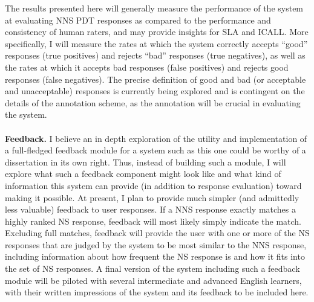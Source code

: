 \documentclass[11pt]{article}
\begin{document}
\par
The results presented here will generally measure the performance of the system at evaluating NNS PDT responses as compared to the performance and consistency of human raters, and may provide insights for SLA and ICALL. More specifically, I will measure the rates at which the system correctly accepts ``good'' responses (true positives) and rejects ``bad'' responses (true negatives), as well as the rates at which it accepts bad responses (false positives) and rejects good responses (false negatives). The precise definition of good and bad (or acceptable and unacceptable) responses is currently being explored and is contingent on the details of the annotation scheme, as the annotation will be crucial in evaluating the system.
\\
\\
\textbf{Feedback.} I believe an in depth exploration of the utility and implementation of a full-fledged feedback module for a system such as this one could be worthy of a dissertation in its own right. Thus, instead of building such a module, I will explore what such a feedback component might look like and what kind of information this system can provide (in addition to response evaluation) toward making it possible. At present, I plan to provide much simpler (and admittedly less valuable) feedback to user responses. If a NNS response exactly matches a highly ranked NS response, feedback will most likely simply indicate the match. Excluding full matches, feedback will provide the user with one or more of the NS responses that are judged by the system to be most similar to the NNS response, including information about how frequent the NS response is and how it fits into the set of NS responses. A final version of the system including such a feedback module will be piloted with several intermediate and advanced English learners, with their written impressions of the system and its feedback to be included here.
\\
\end{document}
